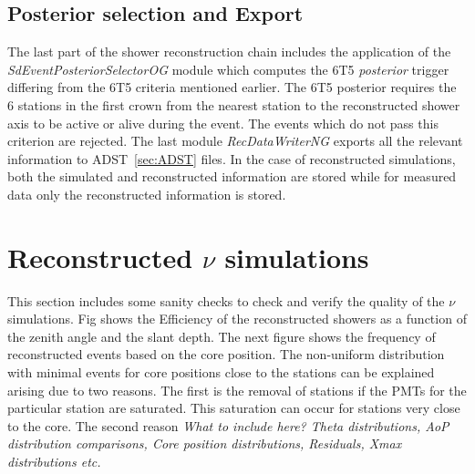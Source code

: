 \subsection{Posterior selection and Export}
\label{subsec:reco_possel}

The last part of the shower reconstruction chain includes the application of the \textit{SdEventPosteriorSelectorOG} module which computes the 6T5 \textit{posterior} trigger differing from the 6T5 criteria mentioned earlier. The 6T5 posterior requires the 6 stations in the first crown from the nearest station to the reconstructed shower axis to be active or alive during the event. The events which do not pass this criterion are rejected. The last module \textit{RecDataWriterNG} exports all the relevant information to ADST~\ref{sec:ADST} files. In the case of reconstructed simulations, both the simulated and reconstructed information are stored while for measured data only the reconstructed information is stored.

\section{Reconstructed \texorpdfstring{$\nu$}{} simulations}
\label{sec:reco_possel}
This section includes some sanity checks to check and verify the quality of the $\nu$ simulations. Fig shows the Efficiency of the reconstructed showers as a function of the zenith angle and the slant depth. The next figure shows the frequency of reconstructed events based on the core position. The non-uniform distribution with minimal events for core positions close to the stations can be explained arising due to two reasons. The first is the removal of stations if the PMTs for the particular station are saturated. This saturation can occur for stations very close to the core. The second reason  
\textit{What to include here? Theta distributions, AoP distribution comparisons, Core position distributions, Residuals, Xmax distributions etc.}

